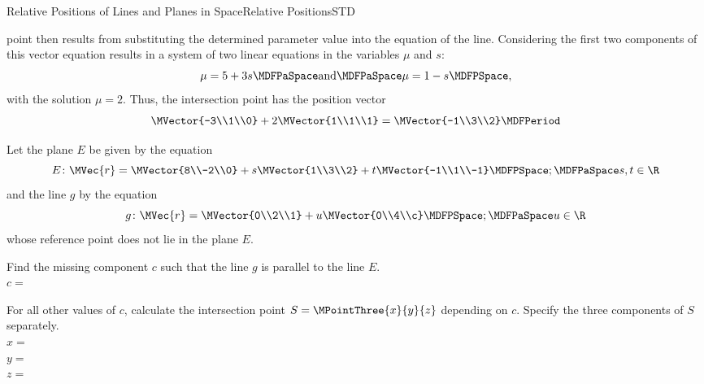 \begin{MXContent}{Relative Positions of Lines and Planes in Space}{Relative Positions}{STD}
\begin{MExample}
\begin{itemize}
  point then results from substituting the determined parameter value into the equation of the line. 
  Considering the first two components of this vector equation results in a system of two linear 
  equations in the variables $\mu$ and $s$:
 \[
  \mu=5+3s\MDFPaSpace\textrm{and}\MDFPaSpace \mu=1-s \MDFPSpace,
 \]
  with the solution $\mu=2$. Thus, the intersection point has the position vector
 \[
  \MVector{-3\\1\\0}+2\MVector{1\\1\\1}=\MVector{-1\\3\\2} \MDFPeriod
 \]
\end{itemize}
\end{MExample}

\begin{MExercise}
Let the plane $E$ be given by the equation
\[
 E\colon\MVec{r}=\MVector{8\\-2\\0}+s\MVector{1\\3\\2}+t\MVector{-1\\1\\-1}\MDFPSpace;\MDFPaSpace s,t\in\R
\]
and the line $g$ by the equation
\[
 g\colon \MVec{r}=\MVector{0\\2\\1}+u\MVector{0\\4\\c}\MDFPSpace;\MDFPaSpace u\in\R 
\]
whose reference point does not lie in the plane $E$.

Find the missing component $c$ such that the line $g$ is parallel to the line $E$.\\
$c=$

For all other values of $c$, calculate the intersection point $S=\MPointThree{x}{y}{z}$ 
depending on $c$. Specify the three components of $S$ separately.\\
$x=$\\
$y=$\\
$z=$


\end{MExercise}
\end{MXContent}
